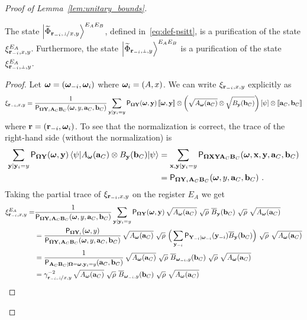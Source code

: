 \begin{proof}[Proof of Lemma~\ref{lem:unitary_bounds}]
\begin{claim}
\label{clm:xi-purification}
The state $\bigket{\wt{\Phi}_\sspxy}^{E_A E_B}$, defined in~\eqref{eq:def-psitt}, is a purification of the state $\xi_{\mathbf{r}_{-i} , x,y}^{E_A}$. Furthermore, the state $\bigket{\wt{\Phi}_\sspy}^{E_A E_B}$ is a purification of the state $\xi_\sspy^{E_A}$. 
\end{claim}
\begin{proof}
Let ${\boldsymbol{\omega}} = ({\boldsymbol{\omega}}_{-i},{\boldsymbol{\omega}}_i)$ where ${\boldsymbol{\omega}}_i = (A,x)$. We can write $\xi_{\mathbf{r}_{-i} , x,y}$ explicitly as
\begin{align*}
	\xi_{\mathbf{r}_{-i} , x,y} = \frac{1}{\mathsf{P}_{{\boldsymbol{\Omega}} \mathbf{Y}_i \mathbf{A}_C \mathbf{B}_C}({\boldsymbol{\omega}},y,\mathbf{a}_C,\mathbf{b}_C)} \sum_{\mathbf{y} | \mathbf{y}_i = y} \mathsf{P}_{{\boldsymbol{\Omega}} \mathbf{Y}}({\boldsymbol{\omega}}, \mathbf{y}) \, \llbracket {\boldsymbol{\omega}}, \mathbf{y} \rrbracket \otimes \left (\sqrt{A_{{\boldsymbol{\omega}}}(\mathbf{a}_C)} \otimes \sqrt{B_{\mathbf{y}}(\mathbf{b}_C)} \right ) \left [\psi \right ] \otimes \llbracket \mathbf{a}_C,\mathbf{b}_C \rrbracket
\end{align*}
where $\mathbf{r} = (\mathbf{r}_{-i},{\boldsymbol{\omega}}_i)$. To see that the normalization is correct, the trace of the right-hand side (without the normalization) is
\begin{align*}
	\sum_{\mathbf{y} | \mathbf{y}_i = y} \mathsf{P}_{{\boldsymbol{\Omega}} \mathbf{Y}}({\boldsymbol{\omega}}, \mathbf{y}) \, {\langle\psi|} A_{\boldsymbol{\omega}}(\mathbf{a}_C) \otimes B_{\mathbf{y}}(\mathbf{b}_C) {|\psi\rangle} &= \sum_{\mathbf{x},\mathbf{y} | \mathbf{y}_i = y} \mathsf{P}_{{\boldsymbol{\Omega}} \mathbf{X} \mathbf{Y} \mathbf{A}_C \mathbf{B}_C}({\boldsymbol{\omega}}, \mathbf{x}, \mathbf{y}, \mathbf{a}_C, \mathbf{b}_C) \\
	&= \mathsf{P}_{{\boldsymbol{\Omega}} \mathbf{Y}_i \mathbf{A}_C \mathbf{B}_C}({\boldsymbol{\omega}},y,\mathbf{a}_C,\mathbf{b}_C)~.
\end{align*}
Taking the partial trace of $\xi_{\mathbf{r}_{-i} , x,y}$ on the register $E_A$ we get
\begin{align}
\xi_\ssxy^{E_A} = &\frac{1}{\P_{\bOmega \bY_i \bA_C \bB_C}(\bomega,y,\ba_C,\bb_C)} \sum_{\by | \by_i = y} \P_{\bOmega \bY}(\bomega, \by) \, \sqrt{A_{\bomega}(\ba_C)} \,\, \sqrt{\rho} \,\, \overline{B}_\by(\bb_C) \,\, \sqrt{\rho} \,\, \sqrt{A_\bomega(\ba_C)}  \notag \\
&= \frac{\P_{\bOmega \bY_i}(\bomega, y)}{\P_{\bOmega \bY_i \bA_C \bB_C}(\bomega,y,\ba_C,\bb_C)} \, \sqrt{A_{\bomega}(\ba_C)} \,\, \sqrt{\rho} \,\, \Big ( \sum_{\by_\mi } \P_{\bY_\mi | \bomega_\mi}(\by_\mi) \overline{B}_\by(\bb_C) \Big) \,\, \sqrt{\rho} \,\, \sqrt{A_\bomega(\ba_C)} \notag \\
&= \frac{1}{\P_{\bA_C \bB_C | \bOmega = \bomega, \by_i = y}(\ba_C,\bb_C)} \, \sqrt{A_{\bomega}(\ba_C)} \,\, \sqrt{\rho} \,\,  \overline{B}_{\bomega_\mi, y} (\bb_C) \,\, \sqrt{\rho} \,\, \sqrt{A_\bomega(\ba_C)} \notag \\
&= \gamma_\sspxy^{-2} \, \sqrt{A_{\bomega}(\ba_C)} \,\, \sqrt{\rho} \,\,  \overline{B}_{\bomega_\mi, y} (\bb_C) \,\, \sqrt{\rho} \,\, \sqrt{A_\bomega(\ba_C)}

\end{align}
\end{proof}
\end{proof}
